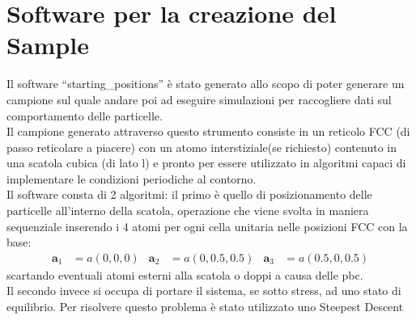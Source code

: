 \documentclass[a4paper,11pt]{article}
\begin{document}
	\section{Software per la creazione del Sample} %
	\label{sec:software_per_la_creazione_del_sample}
		Il software ``starting\_positions'' è stato generato allo scopo di poter 
		generare un campione sul quale andare poi ad eseguire simulazioni per
		raccogliere dati sul comportamento delle particelle.\\
		Il campione generato attraverso questo strumento consiste in un reticolo
		FCC (di passo reticolare a piacere) con un atomo interstiziale(se 
		richiesto) contenuto in una scatola cubica (di lato l) e pronto per
		essere utilizzato in algoritmi capaci di implementare le condizioni periodiche al contorno.\\
		Il software consta di 2 algoritmi: il primo è quello di posizionamento 
		delle particelle all'interno della scatola, operazione che viene svolta
		in maniera sequenziale inserendo i 4 atomi per ogni cella unitaria nelle 
		posizioni FCC con la base:
		\begin{align}
			\mathbf a_1  &= a(0,0,0) & 
			\mathbf a_2  &= a(0,0.5,0.5) &
			\mathbf a_3  &= a(0.5,0,0.5) 
		\end{align}
		scartando eventuali atomi esterni alla scatola o doppi a causa delle pbc.\\
		Il secondo invece si occupa di portare il sistema, se sotto stress, ad uno 
		stato di equilibrio. Per risolvere questo problema è stato utilizzato uno 
		Steepest Descent
\end{document}
